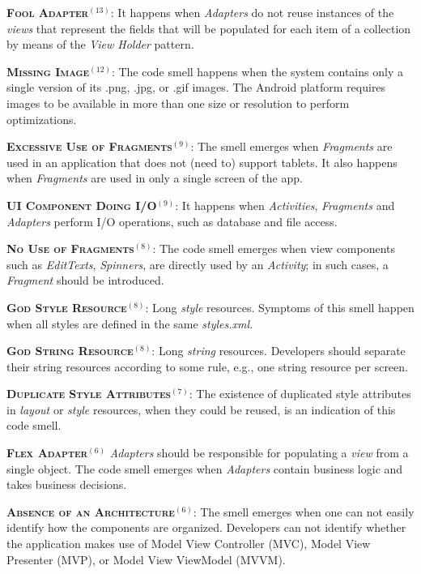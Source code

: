 \noindent
\textsc{\textbf{{\small Fool Adapter}}}$^{(13)}$: 
It happens when \textit{Adapters} do not reuse instances of the \textit{views} that
represent the fields that will be populated for each item of a collection by means
of the \textit{View Holder} pattern. 

\noindent
\textbf{\textsc{{\small Missing Image}}}$^{(12)}$:
The code smell happens when the system contains only a single
version of its .png, .jpg, or .gif images. The Android platform
requires images to be available in more than one size or resolution
to perform optimizations.


\noindent
\textsc{\textbf{{\small Excessive Use of Fragments}}}$^{(9)}$: 
The smell emerges when \textit{Fragments} are used in an application
that does not (need to) support tablets. It also happens when \textit{Fragments} are
used in only a single screen of the app.

\noindent
\textsc{\textbf{{\small UI Component Doing I/O}}}$^{(9)}$:
It happens when \textit{Activities}, \textit{Fragments} and \textit{Adapters} perform
I/O operations, such as database and file access.


\noindent
\textsc{\textbf{{\small No Use of Fragments}}}$^{(8)}$: 
The code smell emerges when view components such as 
\textit{EditTexts}, \textit{Spinners}, are directly used by an \textit{Activity};
in such cases, a \textit{Fragment} should be introduced.


\noindent
\textbf{\textsc{{\small God Style Resource}}}$^{(8)}$:
Long \textit{style} resources. Symptoms of this smell happen when
all styles are defined in the same \textit{styles.xml}.

\noindent
\textbf{\textsc{{\small God String Resource}}}$^{(8)}$:
Long \textit{string} resources. Developers should separate their string
resources according to some rule, e.g., one string resource per screen.

\noindent
\textbf{\textsc{{\small Duplicate Style Attributes}}}$^{(7)}$:
The existence of duplicated style attributes in \textit{layout} or
\textit{style} resources, when they could be reused, is an indication
of this code smell.

\noindent
\textsc{\textbf{{\small Flex Adapter}}}$^{(6)}$ \textit{Adapters} 
should be responsible for populating a \textit{view} from a single object.
The code smell emerges when \textit{Adapters} contain
business logic and takes business decisions. 


\noindent
\textsc{\textbf{{\small Absence of an Architecture}}}$^{(6)}$: 
The smell emerges when one can not easily identify how the components
are organized. Developers can not identify whether the application
makes use of Model View Controller (MVC), Model View Presenter (MVP),
or Model View ViewModel (MVVM).


